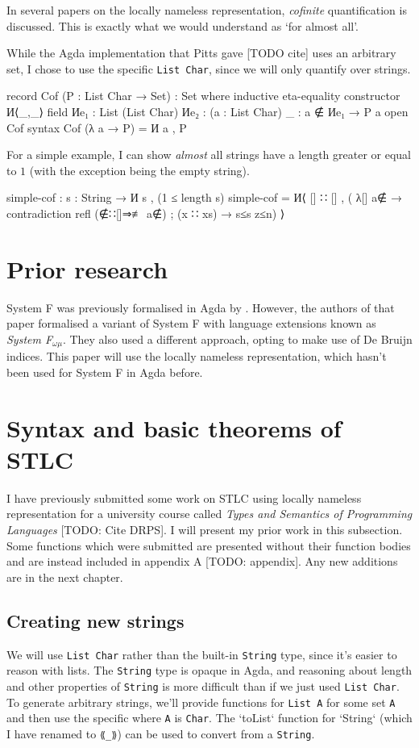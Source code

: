 \documentclass[logo,bsc,singlespacing,parskip,online]{infthesis}
\renewenvironment{code}{\mintedcopy[breaklines,breaksymbolleft=\;]{agda}}{\endmintedcopy}
\begin{document}
In several papers on the locally nameless representation, \textit{cofinite} quantification is
discussed. This is exactly what we would understand as `for almost all'.

While the Agda implementation that Pitts gave [TODO cite] uses an arbitrary set, I chose to use the
specific \texttt{List Char}, since we will only quantify over strings.

\begin{code}
record Cof (P : List Char → Set) : Set where
  inductive
  eta-equality
  constructor И⟨_,_⟩
  field
    Иe₁ : List (List Char)
    Иe₂ : (a : List Char) {_ : a ∉ Иe₁} → P a
open Cof
syntax Cof (λ a → P) = И a , P
\end{code}

For a simple example, I can show \textit{almost} all strings have a length greater or equal to $1$
(with the exception being the empty string).

\begin{code}
simple-cof : {s : String} → И s , (1 ≤ length s)
simple-cof = И⟨ [] ∷ [] , (
  λ{[] {a∉}  → contradiction refl (∉∷[]⇒≢ a∉)
  ; (x ∷ xs) → s≤s z≤n}) ⟩
\end{code}

\section{Prior research}
System F was previously formalised in Agda by \citet{hutton_system_2019}. However, the authors of
that paper formalised a variant of System F with language extensions known as \textit{System
F$_{\omega \mu}$}. They also used a different approach, opting to make use of De Bruijn indices.
This paper will use the locally nameless representation, which hasn't been used for System F in Agda
before.

\section{Syntax and basic theorems of STLC}
I have previously submitted some work on STLC using locally nameless representation for a university
course called \textit{Types and Semantics of Programming Languages} [TODO: Cite DRPS]. I will
present my prior work in this subsection. Some functions which were submitted are presented without their
function bodies and are instead included in appendix A [TODO: appendix]. Any new additions are in
the next chapter.

\subsection{Creating new strings}
We will use \texttt{List Char} rather than the built-in \texttt{String} type, since it's easier to
reason with lists. The \texttt{String} type is opaque in Agda, and reasoning about length and other
properties of \texttt{String} is more difficult than if we just used \texttt{List Char}. To generate
arbitrary strings, we'll provide functions for \texttt{List A} for some set \texttt{A} and then use
the specific where \texttt{A} is \texttt{Char}. The `toList` function for `String` (which I have
renamed to \texttt{⟪\_⟫}) can be used to convert from a \texttt{String}.
\end{document}
